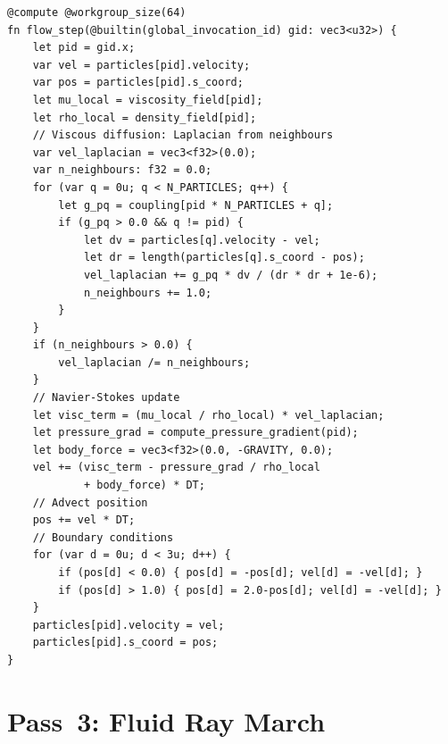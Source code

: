 \begin{lstlisting}[style=wgsl,caption={Pass 2: Flow Integration (WGSL)}]
@compute @workgroup_size(64)
fn flow_step(@builtin(global_invocation_id) gid: vec3<u32>) {
    let pid = gid.x;
    var vel = particles[pid].velocity;
    var pos = particles[pid].s_coord;
    let mu_local = viscosity_field[pid];
    let rho_local = density_field[pid];
    // Viscous diffusion: Laplacian from neighbours
    var vel_laplacian = vec3<f32>(0.0);
    var n_neighbours: f32 = 0.0;
    for (var q = 0u; q < N_PARTICLES; q++) {
        let g_pq = coupling[pid * N_PARTICLES + q];
        if (g_pq > 0.0 && q != pid) {
            let dv = particles[q].velocity - vel;
            let dr = length(particles[q].s_coord - pos);
            vel_laplacian += g_pq * dv / (dr * dr + 1e-6);
            n_neighbours += 1.0;
        }
    }
    if (n_neighbours > 0.0) {
        vel_laplacian /= n_neighbours;
    }
    // Navier-Stokes update
    let visc_term = (mu_local / rho_local) * vel_laplacian;
    let pressure_grad = compute_pressure_gradient(pid);
    let body_force = vec3<f32>(0.0, -GRAVITY, 0.0);
    vel += (visc_term - pressure_grad / rho_local
            + body_force) * DT;
    // Advect position
    pos += vel * DT;
    // Boundary conditions
    for (var d = 0u; d < 3u; d++) {
        if (pos[d] < 0.0) { pos[d] = -pos[d]; vel[d] = -vel[d]; }
        if (pos[d] > 1.0) { pos[d] = 2.0-pos[d]; vel[d] = -vel[d]; }
    }
    particles[pid].velocity = vel;
    particles[pid].s_coord = pos;
}
\end{lstlisting}

\section{Pass~3: Fluid Ray March}
\label{sec:pass3}


